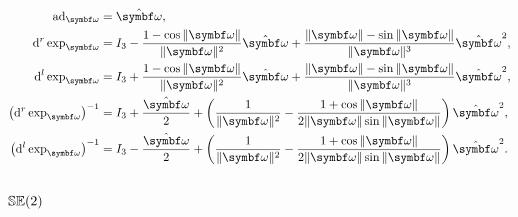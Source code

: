 \begin{properties}[title={Lowercase adjoint and exponential derivatives on $\SOthree$}]
  \begin{align}
    \ad_\bomega                                     & = \hat \bomega,                                                                                                                                              \\
    \mathrm{d}^r \exp_{\bomega}                     & =        I_3 - \frac{1 - \cos \| \bomega \|}{\| \bomega \|^2} \hat {\bomega} + \frac{ \| \bomega \| - \sin \| \bomega \| }{\| \bomega\|^3} \hat {\bomega}^2, \\
    \mathrm{d}^l \exp_{\bomega}                     & = I_3 + \frac{1 - \cos \| \bomega \|}{\| \bomega \|^2} \hat {\bomega} + \frac{ \| \bomega \| - \sin \| \bomega \| }{\| \bomega\|^3} \hat {\bomega}^2,        \\
    \left( \mathrm{d}^r \exp_{\bomega} \right)^{-1} & = I_3 + \frac{\hat \bomega}{2} + \left( \frac{1}{\| \bomega \|^2} - \frac{1 + \cos \| \bomega \| }{2 \|\bomega \| \sin \|\bomega \|} \right) \hat \bomega^2, \\
    \left( \mathrm{d}^l \exp_{\bomega} \right)^{-1} & = I_3 - \frac{\hat \bomega}{2} + \left( \frac{1}{\| \bomega \|^2} - \frac{1 + \cos \| \bomega \| }{2 \|\bomega \| \sin \|\bomega \|} \right) \hat \bomega^2.
  \end{align}
\end{properties}

\subsection{\texorpdfstring{${\mathbb{SE}(2)}$}{SE(2)}}

